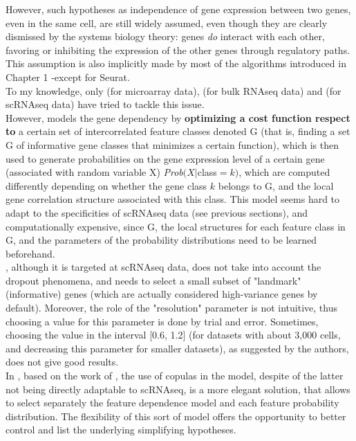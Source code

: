 \documentclass{report}
\begin{document}
However, such hypotheses as independence of gene expression between two genes, even in the same cell, are still widely assumed\cite{barash2002context}, even though they are clearly dismissed by the systems biology theory: genes \textit{do} interact with each other, favoring or inhibiting the expression of the other genes through regulatory paths. This assumption is also implicitly made by most of the algorithms introduced in Chapter 1 -except for Seurat\cite{satija2015spatial}.\\

To my knowledge, only \cite{barash2002context} (for microarray data), \cite{zhang2017classification} (for bulk RNAseq data) and \cite{satija2015spatial} (for scRNAseq data) have tried to tackle this issue.\\

However, \cite{barash2002context} models the gene dependency by \textbf{optimizing a cost function respect to} a certain set of intercorrelated feature classes denoted G (that is, finding a set G of informative gene classes that minimizes a certain function), which is then used to generate probabilities on the gene expression level of a certain gene (associated with random variable X) \textit{Prob}$(X | $class$ = k)$, which are computed differently depending on whether the gene class $k$ belongs to G, and the local gene correlation structure associated with this class. This model seems hard to adapt to the specificities of scRNAseq data (see previous sections), and computationally expensive, since G, the local structures for each feature class in G, and the parameters of the probability distributions need to be learned beforehand.\\

\cite{satija2015spatial}, although it is targeted at scRNAseq data, does not take into account the dropout phenomena, and needs to select a small subset of "landmark" (informative) genes (which are actually considered high-variance genes by default). Moreover, the role of the "resolution" parameter is not intuitive, thus choosing a value for this parameter is done by trial and error. Sometimes, choosing the value in the interval [0.6, 1.2] (for datasets with about 3,000 cells, and decreasing this parameter for smaller datasets), as suggested by the authors\cite{seuratparam}, does not give good results.\\

In \cite{zhang2017classification}, based on the work of \cite{hee2014copula}, the use of copulas in the model, despite of the latter not being directly adaptable to scRNAseq, is a more elegant solution, that allows to select separately the feature dependence model and each feature probability distribution. The flexibility of this sort of model offers the opportunity to better control and list the underlying  simplifying hypotheses.\\
\end{document}
